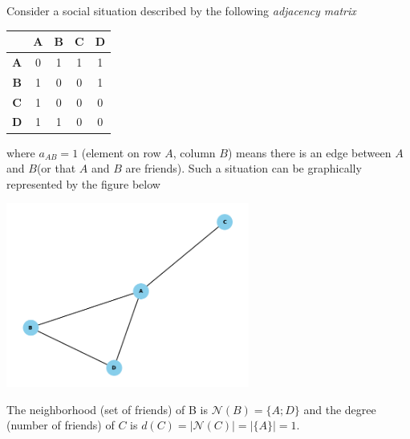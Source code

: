 \documentclass[12pt,reqno, a4]{amsart}
\begin{document}
\begin{example}
    Consider a social situation described by the following \textit{adjacency matrix}
    
    \begin{table}[h]
        \centering
        \begin{tabular}{|c|c|c|c|c|}
        \hline
             & \textbf{A} & \textbf{B} & \textbf{C} & \textbf{D} \\ \hline
           \textbf{A}  & 0 & 1 & 1 & 1 \\ \hline
           \textbf{B} & 1 & 0 & 0 & 1\\ \hline
           \textbf{C} & 1 & 0 & 0 & 0\\ \hline
           \textbf{D} & 1 & 1 & 0 & 0 \\ \hline
        \end{tabular}
    \end{table}
     \noindent where $a_{AB} = 1$ (element on row $A$, column $B$) means there is an edge between $A$ and $B$(or that $A$ and $B$ are friends). Such a situation can be graphically represented by the figure below
     \begin{center}
         \includegraphics[width = 0.6\textwidth]{illustration/example graph.png}
     \end{center}
     The neighborhood (set of friends) of B is \(\mathcal{N}(B) = \{A ; D\}\) and the degree (number of friends) of $C$ is $d(C) = |\mathcal{N}(C)| = |\{A\}| = 1$.
\end{example}
\end{document}
